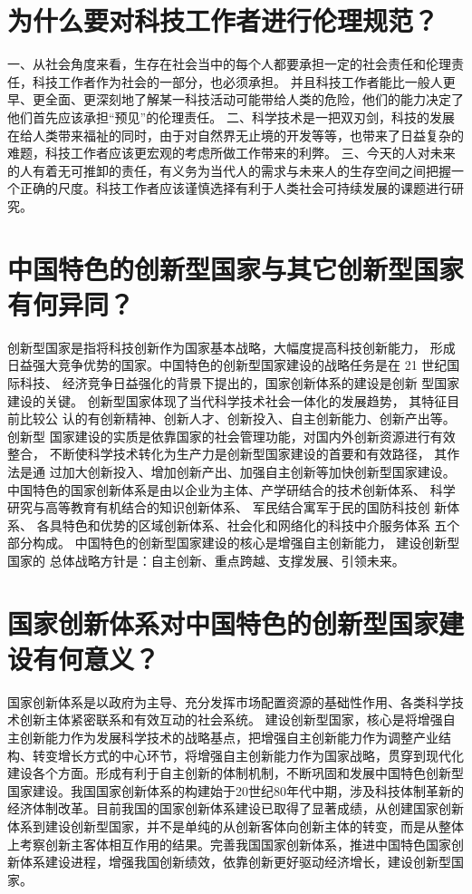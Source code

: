 \documentclass[a4paper]{article}
\begin{document}
\section{为什么要对科技工作者进行伦理规范？}

一、从社会角度来看，生存在社会当中的每个人都要承担一定的社会责任和伦理责任，科技工作者作为社会的一部分，也必须承担。 并且科技工作者能比一般人更早、更全面、更深刻地了解某一科技活动可能带给人类的危险，他们的能力决定了他们首先应该承担“预见”的伦理责任。  二、科学技术是一把双刃剑，科技的发展在给人类带来福祉的同时，由于对自然界无止境的开发等等，也带来了日益复杂的难题，科技工作者应该更宏观的考虑所做工作带来的利弊。  三、今天的人对未来的人有着无可推卸的责任，有义务为当代人的需求与未来人的生存空间之间把握一个正确的尺度。科技工作者应该谨慎选择有利于人类社会可持续发展的课题进行研究。

\section{中国特色的创新型国家与其它创新型国家有何异同？}

创新型国家是指将科技创新作为国家基本战略，大幅度提高科技创新能力， 形成日益强大竞争优势的国家。中国特色的创新型国家建设的战略任务是在 21 世纪国际科技、 经济竞争日益强化的背景下提出的，国家创新体系的建设是创新 型国家建设的关键。 创新型国家体现了当代科学技术社会一体化的发展趋势， 其特征目前比较公 认的有创新精神、创新人才、创新投入、自主创新能力、创新产出等。 创新型 国家建设的实质是依靠国家的社会管理功能，对国内外创新资源进行有效整合， 不断使科学技术转化为生产力是创新型国家建设的首要和有效路径， 其作法是通 过加大创新投入、增加创新产出、加强自主创新等加快创新型国家建设。 中国特色的国家创新体系是由以企业为主体、产学研结合的技术创新体系、 科学研究与高等教育有机结合的知识创新体系、 军民结合寓军于民的国防科技创 新体系、 各具特色和优势的区域创新体系、社会化和网络化的科技中介服务体系 五个部分构成。 中国特色的创新型国家建设的核心是增强自主创新能力， 建设创新型国家的 总体战略方针是：自主创新、重点跨越、支撑发展、引领未来。

\section{国家创新体系对中国特色的创新型国家建设有何意义？}

国家创新体系是以政府为主导、充分发挥市场配置资源的基础性作用、各类科学技术创新主体紧密联系和有效互动的社会系统。  建设创新型国家，核心是将增强自主创新能力作为发展科学技术的战略基点，把增强自主创新能力作为调整产业结构、转变增长方式的中心环节，将增强自主创新能力作为国家战略，贯穿到现代化建设各个方面。形成有利于自主创新的体制机制，不断巩固和发展中国特色创新型国家建设。我国国家创新体系的构建始于20世纪80年代中期，涉及科技体制革新的经济体制改革。目前我国的国家创新体系建设已取得了显著成绩，从创建国家创新体系到建设创新型国家，并不是单纯的从创新客体向创新主体的转变，而是从整体上考察创新主客体相互作用的结果。完善我国国家创新体系，推进中国特色国家创新体系建设进程，增强我国创新绩效，依靠创新更好驱动经济增长，建设创新型国家。
\end{document}
